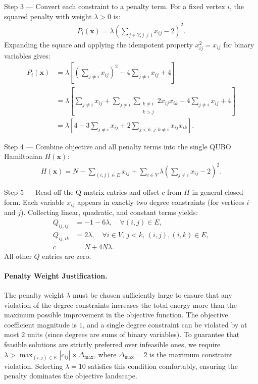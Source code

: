 \documentclass[12pt]{article}
\begin{document}
Step 3 --- Convert each constraint to a penalty term. For a fixed vertex $i$, the squared penalty with weight $\lambda > 0$ is:
\begin{align}
P_i(\mathbf{x}) = \lambda \left( \sum_{j \in V, j \neq i} x_{ij} - 2 \right)^2.
\end{align}
Expanding the square and applying the idempotent property $x_{ij}^2 = x_{ij}$ for binary variables gives:
\begin{align}
P_i(\mathbf{x}) &= \lambda \left[ \left(\sum_{j \neq i} x_{ij}\right)^2 - 4 \sum_{j \neq i} x_{ij} + 4 \right] \\
&= \lambda \left[ \sum_{j \neq i} x_{ij} + \sum_{j \neq i} \sum_{\substack{k \neq i \\ k > j}} 2 x_{ij} x_{ik} - 4 \sum_{j \neq i} x_{ij} + 4 \right] \\
&= \lambda \left[ 4 - 3 \sum_{j \neq i} x_{ij} + 2 \sum_{j < k, \, j,k \neq i} x_{ij} x_{ik} \right].
\end{align}

Step 4 --- Combine objective and all penalty terms into the single QUBO Hamiltonian $H(\mathbf{x})$:
\begin{align}
H(\mathbf{x}) = N - \sum_{(i,j) \in E} x_{ij} + \sum_{i \in V} \lambda \left( \sum_{j \neq i} x_{ij} - 2 \right)^2.
\end{align}

Step 5 --- Read off the Q matrix entries and offset $c$ from $H$ in general closed form. Each variable $x_{ij}$ appears in exactly two degree constraints (for vertices $i$ and $j$). Collecting linear, quadratic, and constant terms yields:
\begin{align}
Q_{ij,ij} &= -1 - 6\lambda, \quad \forall (i,j) \in E, \\
Q_{ij,ik} &= 2\lambda, \quad \forall i \in V, \, j < k, \, (i,j), (i,k) \in E, \\
c &= N + 4N\lambda.
\end{align}
All other $Q$ entries are zero.

\paragraph{Penalty Weight Justification.}
The penalty weight $\lambda$ must be chosen sufficiently large to ensure that any violation of the degree constraints increases the total energy more than the maximum possible improvement in the objective function. The objective coefficient magnitude is $1$, and a single degree constraint can be violated by at most $2$ units (since degrees are sums of binary variables). To guarantee that feasible solutions are strictly preferred over infeasible ones, we require $\lambda > \max_{(i,j) \in E} |c_{ij}| \times \Delta_{\text{max}}$, where $\Delta_{\text{max}} = 2$ is the maximum constraint violation. Selecting $\lambda = 10$ satisfies this condition comfortably, ensuring the penalty dominates the objective landscape.
\end{document}

